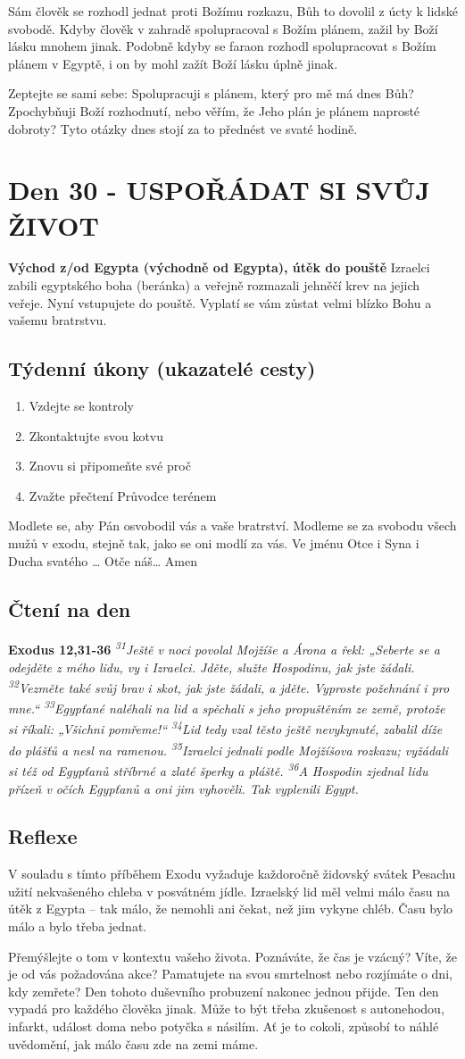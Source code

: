 \documentclass[11pt]{article}
\newcommand{\zacatekPatyTyden}{
  \textbf{Východ z/od Egypta (východně od Egypta), útěk do pouště} \newline
  Izraelci zabili egyptského boha (beránka) a veřejně rozmazali jehněčí krev na jejich veřeje. Nyní vstupujete
  do pouště. Vyplatí se vám zůstat velmi blízko Bohu a vašemu bratrstvu.

\subsection*{Týdenní úkony (ukazatelé cesty)}
\begin{enumerate}
  \item Vzdejte se kontroly
  \item Zkontaktujte svou kotvu
  \item Znovu si připomeňte své proč
  \item Zvažte přečtení Průvodce terénem
\end{enumerate}
Modlete se, aby Pán osvobodil vás a vaše bratrství. \newline
Modleme se za svobodu všech mužů v exodu, stejně tak, jako se oni modlí za vás.\newline
Ve jménu Otce i Syna i Ducha svatého …  Otče náš… Amen
}
\begin{document}
Sám člověk se rozhodl jednat proti Božímu rozkazu, Bůh to dovolil z úcty k lidské svobodě. Kdyby člověk v
zahradě spolupracoval s Božím plánem, zažil by Boží lásku mnohem jinak. Podobně kdyby se faraon rozhodl
spolupracovat s Božím plánem v Egyptě, i on by mohl zažít Boží lásku úplně jinak.

Zeptejte se sami sebe: Spolupracuji s plánem, který pro mě má dnes Bůh? Zpochybňuji Boží rozhodnutí,
nebo věřím, že Jeho plán je plánem naprosté dobroty? Tyto otázky dnes stojí za to přednést ve svaté hodině.


\newpage
\section{Den 30 - USPOŘÁDAT SI SVŮJ ŽIVOT}
\zacatekPatyTyden
\subsection*{Čtení na den}
\textbf{Exodus 12,31-36}
\newline
\textit{
\textsuperscript{31}Ještě v noci povolal Mojžíše a Árona a řekl: „Seberte se a odejděte z mého lidu, vy i Izraelci. Jděte, služte Hospodinu, jak jste žádali.
\textsuperscript{32}Vezměte také svůj brav i skot, jak jste žádali, a jděte. Vyproste požehnání i pro mne.“
\textsuperscript{33}Egypťané naléhali na lid a spěchali s jeho propuštěním ze země, protože si říkali: „Všichni pomřeme!“
\textsuperscript{34}Lid tedy vzal těsto ještě nevykynuté, zabalil díže do plášťů a nesl na ramenou.
\textsuperscript{35}Izraelci jednali podle Mojžíšova rozkazu; vyžádali si též od Egypťanů stříbrné a zlaté šperky a pláště.
\textsuperscript{36}A Hospodin zjednal lidu přízeň v očích Egypťanů a oni jim vyhověli. Tak vyplenili Egypt.
}

\subsection*{Reflexe}

V souladu s tímto příběhem Exodu vyžaduje každoročně židovský svátek Pesachu užití nekvašeného chleba
v posvátném jídle. Izraelský lid měl velmi málo času na útěk z Egypta – tak málo, že nemohli ani čekat, než jim
vykyne chléb. Času bylo málo a bylo třeba jednat.

Přemýšlejte o tom v kontextu vašeho života. Poznáváte, že čas je vzácný? Víte, že je od vás požadována akce?
Pamatujete na svou smrtelnost nebo rozjímáte o dni, kdy zemřete? Den tohoto duševního probuzení nakonec jednou
přijde. Ten den vypadá pro každého člověka jinak. Může to být třeba zkušenost s autonehodou, infarkt, událost doma
nebo potyčka s násilím. Ať je to cokoli, způsobí to náhlé uvědomění, jak málo času zde na zemi máme.
\end{document}
